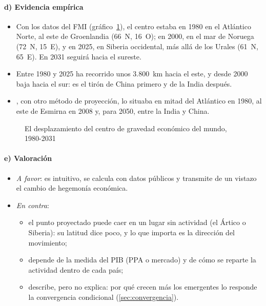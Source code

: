 \documentclass[11pt]{article}
\begin{document}
\paragraph{d) Evidencia empírica}

\begin{itemize}
\item Con los datos del FMI (gráfico~\ref{fig:centro-gravedad}), el centro estaba en 1980 en el Atlántico Norte, al este de Groenlandia (66\textdegree{}~N, 16\textdegree{}~O); en 2000, en el mar de Noruega (72\textdegree{}~N, 15\textdegree{}~E), y en 2025, en Siberia occidental, más allá de los Urales (61\textdegree{}~N, 65\textdegree{}~E). En 2031 seguirá hacia el sureste\nocite{FMI2026DataMapper,NaturalEarth2026}.
\item Entre 1980 y 2025 ha recorrido unos 3.800~km hacia el este, y desde 2000 baja hacia el sur: es el tirón de China primero y de la India después\nocite{FMI2026DataMapper}.
\item \textcite{Quah2011Shifting}, con otro método de proyección, lo situaba en mitad del Atlántico en 1980, al este de Esmirna en 2008 y, para 2050, entre la India y China.
\end{itemize}

\begin{figure}[H]
\centering
\caption{El desplazamiento del centro de gravedad económico del mundo, 1980-2031}\label{fig:centro-gravedad}
\end{figure}

\paragraph{e) Valoración}

\begin{itemize}
\item \emph{A favor}: es intuitivo, se calcula con datos públicos y transmite de un vistazo el cambio de hegemonía económica.
\item \emph{En contra}:
  \begin{itemize}
  \item el punto proyectado puede caer en un lugar sin actividad (el Ártico o Siberia): su latitud dice poco, y lo que importa es la dirección del movimiento;
  \item depende de la medida del PIB (PPA o mercado) y de cómo se reparte la actividad dentro de cada país;
  \item describe, pero no explica: por qué crecen más los emergentes lo responde la convergencia condicional (\ref{sec:convergencia}).
  \end{itemize}
\end{itemize}
\end{document}
